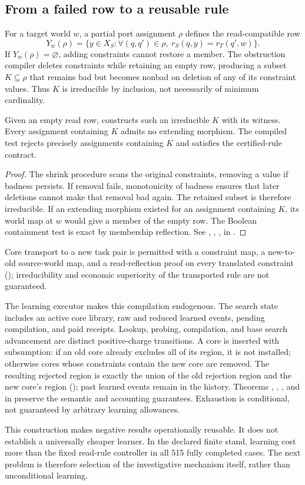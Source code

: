 \subsection{From a failed row to a reusable rule}
For a target world $w$, a partial port assignment $\rho$ defines the read-compatible row
\[
 Y_w(\rho)=\{y\in X_S: \forall(q,q')\in\rho,\ r_S(q,y)=r_T(q',w)\}.
\]
If $Y_w(\rho)=\varnothing$, adding constraints cannot restore a member. The obstruction compiler deletes constraints while retaining an empty row, producing a subset $K\subseteq\rho$ that remains bad but becomes nonbad on deletion of any of its constraint values. Thus $K$ is irreducible by inclusion, not necessarily of minimum cardinality.
\begin{theorem}\label{thm:core}
Given an empty read row,  constructs such an irreducible $K$ with its witness. Every assignment containing $K$ admits no extending morphism. The compiled test rejects precisely assignments containing $K$ and satisfies the certified-rule contract.
\end{theorem}
\begin{proof}
The shrink procedure scans the original constraints, removing a value if badness persists. If removal fails, monotonicity of badness ensures that later deletions cannot make that removal bad again. The retained subset is therefore irreducible. If an extending morphism existed for an assignment containing $K$, its world map at $w$ would give a member of the empty row. The Boolean containment test is exact by membership reflection. See , , ,  in .
\end{proof}
Core transport to a new task pair is permitted with a constraint map, a new-to-old source-world map, and a read-reflection proof on every translated constraint (); irreducibility and economic superiority of the transported rule are not guaranteed.

The learning executor makes this compilation endogenous. The search state includes an active core library, raw and reduced learned events, pending compilation, and paid receipts. Lookup, probing, compilation, and base search advancement are distinct positive-charge transitions. A core is inserted with subsumption: if an old core already excludes all of its region, it is not installed; otherwise cores whose constraints contain the new core are removed. The resulting rejected region is exactly the union of the old rejection region and the new core's region (); past learned events remain in the history. Theorems , , , and  in  preserve the semantic and accounting guarantees. Exhaustion is conditional, not guaranteed by arbitrary learning allowances.

This construction makes negative results operationally reusable. It does not establish a universally cheaper learner. In the declared finite stand, learning cost more than the fixed read-rule controller in all 515 fully completed cases. The next problem is therefore selection of the investigative mechanism itself, rather than unconditional learning.
